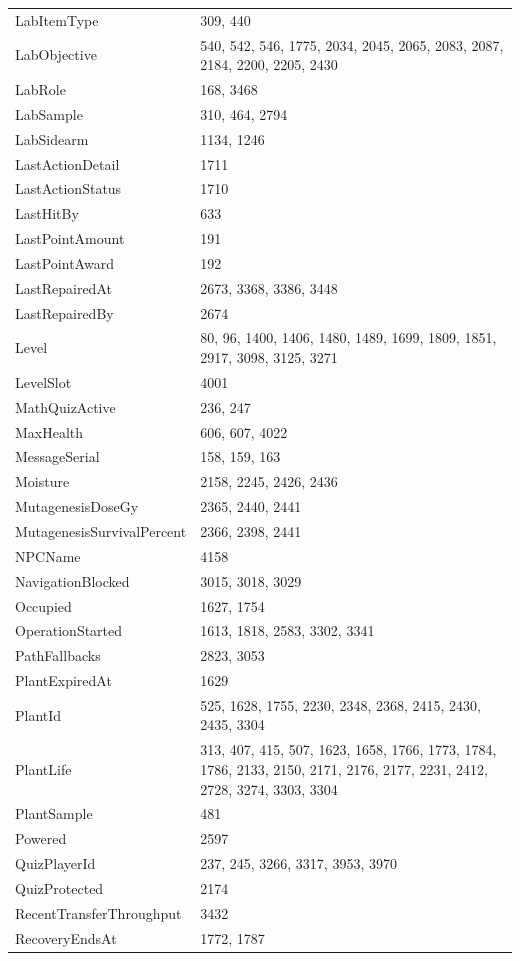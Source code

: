 \begin{longtable}{p{}p{}}
LabItemType & 309, 440 \\
LabObjective & 540, 542, 546, 1775, 2034, 2045, 2065, 2083, 2087, 2184, 2200, 2205, 2430 \\
LabRole & 168, 3468 \\
LabSample & 310, 464, 2794 \\
LabSidearm & 1134, 1246 \\
LastActionDetail & 1711 \\
LastActionStatus & 1710 \\
LastHitBy & 633 \\
LastPointAmount & 191 \\
LastPointAward & 192 \\
LastRepairedAt & 2673, 3368, 3386, 3448 \\
LastRepairedBy & 2674 \\
Level & 80, 96, 1400, 1406, 1480, 1489, 1699, 1809, 1851, 2917, 3098, 3125, 3271 \\
LevelSlot & 4001 \\
MathQuizActive & 236, 247 \\
MaxHealth & 606, 607, 4022 \\
MessageSerial & 158, 159, 163 \\
Moisture & 2158, 2245, 2426, 2436 \\
MutagenesisDoseGy & 2365, 2440, 2441 \\
MutagenesisSurvivalPercent & 2366, 2398, 2441 \\
NPCName & 4158 \\
NavigationBlocked & 3015, 3018, 3029 \\
Occupied & 1627, 1754 \\
OperationStarted & 1613, 1818, 2583, 3302, 3341 \\
PathFallbacks & 2823, 3053 \\
PlantExpiredAt & 1629 \\
PlantId & 525, 1628, 1755, 2230, 2348, 2368, 2415, 2430, 2435, 3304 \\
PlantLife & 313, 407, 415, 507, 1623, 1658, 1766, 1773, 1784, 1786, 2133, 2150, 2171, 2176, 2177, 2231, 2412, 2728, 3274, 3303, 3304 \\
PlantSample & 481 \\
Powered & 2597 \\
QuizPlayerId & 237, 245, 3266, 3317, 3953, 3970 \\
QuizProtected & 2174 \\
RecentTransferThroughput & 3432 \\
RecoveryEndsAt & 1772, 1787 \\

\end{longtable}
